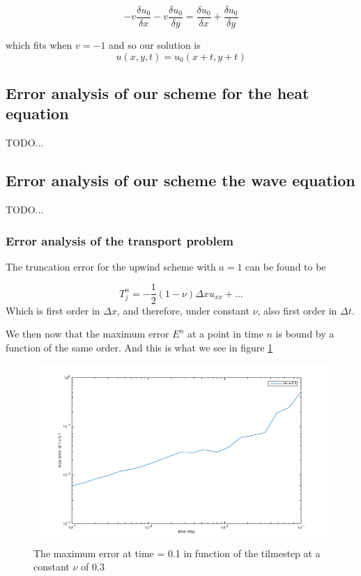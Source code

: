 \begin{equation}
-v\frac{\delta u_0}{\delta x}-v\frac{\delta u_0}{\delta y} = \frac{\delta u_0}{\delta x}+\frac{\delta u_0}{\delta y} 
\end{equation}

which fits when $v=-1$ and so our solution is
\begin{equation}
u(x,y,t)=u_0(x+t,y+t)
\end{equation}

\subsection{Error analysis of our scheme for the heat equation}
TODO...
\subsection{Error analysis of our scheme the wave equation}
TODO...


\subsubsection{Error analysis of the transport problem}

The truncation error for the upwind scheme with $a=1$ can be found to be

\begin{equation}
T_j^n = -\frac{1}{2}(1-\nu)\Delta x u_{xx} + ...
\end{equation}
Which is first order in $\Delta x$, and therefore, under constant $\nu$, also first order in $\Delta t$.

We then now that the maximum error $E^n$ at a point in time $n$ is bound by a function of the same order. And this is what we see in figure \ref{errororrrTransport}

\begin{figure}[htbp] %
   \centering
   \includegraphics[scale=0.3]{images/errororrrTransport} 
   \caption{The maximum error at time = 0.1 in function of the tilmestep at a constant $\nu$ of 0.3 }
   \label{errororrrTransport}
\end{figure}




